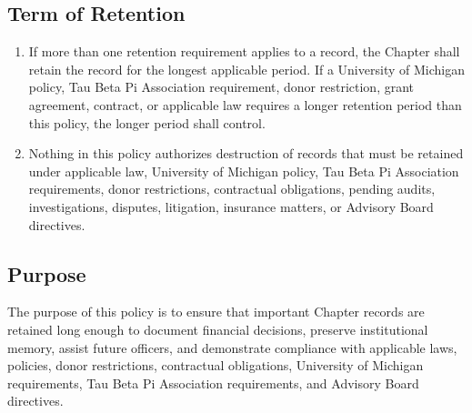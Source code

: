 \subsection{Term of Retention} \label{XII.3}
\begin{enumerate}
    \item If more than one retention requirement applies to a record, the Chapter shall retain the record for the longest applicable period. 
    If a University of Michigan policy, Tau Beta Pi Association requirement, donor restriction, grant agreement, 
    contract, or applicable law requires a longer retention period than this policy, the longer period shall control.
    \item Nothing in this policy authorizes destruction of records that must be retained under applicable law, University of Michigan policy, 
    Tau Beta Pi Association requirements, donor restrictions, contractual obligations, pending audits, investigations, disputes, litigation, insurance matters, or Advisory Board directives.
\end{enumerate}

\subsection{Purpose} \label{XII.4}
The purpose of this policy is to ensure that important Chapter records are retained long enough to document financial decisions, preserve institutional memory, 
assist future officers, and demonstrate compliance with applicable laws, policies, donor restrictions, contractual obligations, University of Michigan requirements, 
Tau Beta Pi Association requirements, and Advisory Board directives.

